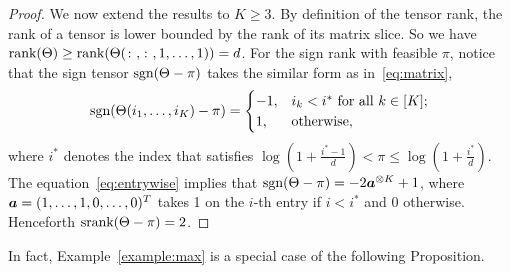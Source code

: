 \documentclass[11pt]{article}
\theoremstyle{plain}
\theoremstyle{definition}
\def\sign{\textup{sgn}}
\def\srank{\textup{srank}}
\def\rank{\textup{rank}}
\begin{document}
\begin{proof}
We now extend the results to $K\geq 3$. By definition of the tensor rank, the rank of a tensor is lower bounded by the rank of its matrix slice.  So we have $\rank(\Theta)\geq \rank(\Theta(\colon,\colon,1,\ldots,1))=d$. For the sign rank with feasible $\pi$, notice that the sign tensor $\sign(\Theta-\pi)$ takes the similar form as in~\eqref{eq:matrix},
\begin{equation}\label{eq:entrywise}
\sign (\Theta(i_1,\ldots,i_K)-\pi)=
\begin{cases}
-1, & \text{$i_k<i^*$ for all $k\in[K]$};\\
1, & \text{otherwise},
\end{cases}
\end{equation}
where $i^*$ denotes the index that satisfies $\log(1+\frac{i^*-1}{d})<\pi\leq \log(1+\frac{i^*}{d})$.
The equation~\eqref{eq:entrywise} implies that $\sign(\Theta-\pi)=-2\ma^{\otimes K}+1$, where $\bm{a}=(1,\ldots,1,0,\ldots,0)^T$ takes 1 on the $i$-th entry if $i<i^*$ and 0 otherwise. Henceforth $\srank(\Theta-\pi)=2$. 
\end{proof}

In fact, Example~\ref{example:max} is a special case of the following Proposition. 
\end{document}

